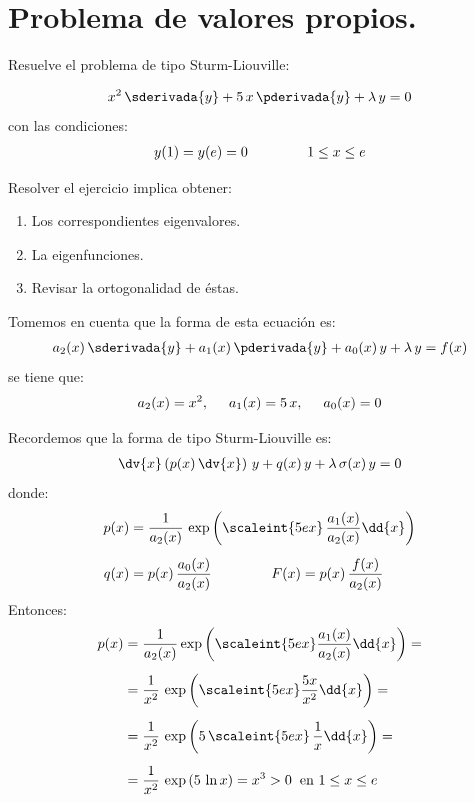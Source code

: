 \section{Problema de valores propios.}

\begin{ejemplo}
Resuelve el problema de tipo Sturm-Liouville:

\begin{align*}
x^{2} \, \sderivada{y} + 5 \, x \, \pderivada{y} + \lambda \, y = 0
\end{align*}
con las condiciones:
\begin{align*}
y(1) = y(e) = 0 \hspace{1.5cm} 1 \leq x \leq e
\end{align*}

Resolver el ejercicio implica obtener:
\begin{enumerate}
\item Los correspondientes eigenvalores.
\item La eigenfunciones.
\item Revisar la ortogonalidad de éstas.
\end{enumerate}

Tomemos en cuenta que la forma de esta ecuación es:
\begin{align*}
a_{2} (x) \, \sderivada{y} + a_{1} (x) \, \pderivada{y} + a_{0}(x) \, y + \lambda \, y = f(x)
\end{align*}
se tiene que:
\begin{align*}
a_{2} (x) = x^{2}, \hspace{0.5cm} a_{1} (x) = 5\, x, \hspace{0.5cm} a_{0} (x) = 0
\end{align*}

Recordemos que la forma de tipo Sturm-Liouville es:
\begin{align*}
\dv{x} \left( p(x) \, \dv{x} \right) \, y + q(x) \, y + \lambda \, \sigma (x) \, y = 0
\end{align*}
donde:
\begin{align*}
p (x) &= \dfrac{1}{a_{2} (x)} \, \exp \left( \scaleint{5ex} \, \dfrac{a_{1} (x)}{a_{2} (x)} \dd{x} \right) \\[0.5em] 
q (x) &= p (x) \, \dfrac{a_{0} (x)}{a_{2} (x)} \hspace{1.5cm} F (x) = p (x) \, \dfrac{f (x)}{a_{2} (x)}
\end{align*}
Entonces:
\begin{align*}
p(x) &= \dfrac{1}{a_{2}(x)} \exp \left( \scaleint{5ex} \dfrac{a_{1}(x)}{a_{2}(x)} \dd{x} \right) = \\[0.5em] 
&= \dfrac{1}{x^{2}} \, \exp \left( \scaleint{5ex} \dfrac{5 x}{x^{2}} \dd{x} \right) = \\[0.5em] 
&= \dfrac{1}{x^{2}} \,  \exp \left( 5 \, \scaleint{5ex} \, \dfrac{1}{x} \dd{x} \right) = \\[0.5em] 
&= \dfrac{1}{x^{2}} \,  \exp \left( 5 \, \ln x \right) =  x^{3} > 0 \hspace{0.2cm} \mbox{en } 1 \leq x \leq e
\end{align*}


\end{ejemplo}
